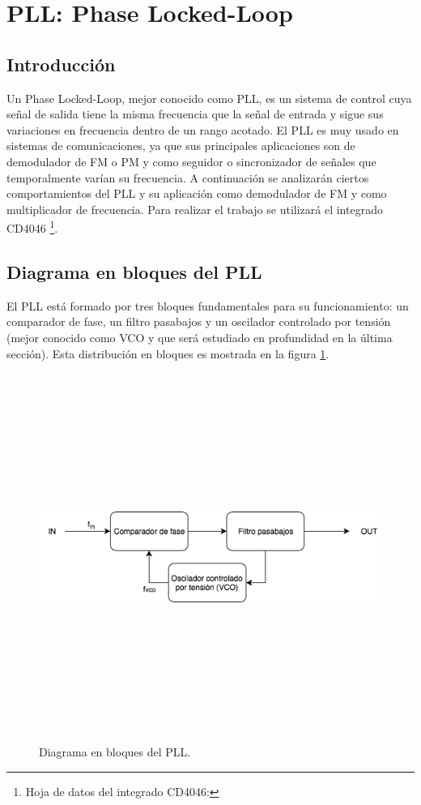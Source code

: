 \section{PLL: Phase Locked-Loop}

\subsection{Introducci\'on}

Un Phase Locked-Loop, mejor conocido como PLL, es un sistema de control cuya se\~nal de salida tiene la misma frecuencia que la se\~nal de entrada y sigue sus variaciones en frecuencia dentro de un rango acotado. El PLL es muy usado en sistemas de comunicaciones, ya que sus principales aplicaciones son de demodulador de FM o PM y como seguidor o sincronizador de se\~nales que temporalmente var\'ian su frecuencia. A continuaci\'on se analizar\'an ciertos comportamientos del PLL y su aplicaci\'on como demodulador de FM y como multiplicador de frecuencia. Para realizar el trabajo se utilizar\'a el integrado CD4046 \footnote{Hoja de datos del integrado CD4046:}.

\subsection{Diagrama en bloques del PLL}

El PLL est\'a formado por tres bloques fundamentales para su funcionamiento: un comparador de fase, un filtro pasabajos y un oscilador controlado por tensi\'on (mejor conocido como VCO y que ser\'a estudiado en profundidad en la \'ultima secci\'on). Esta distribuci\'on en bloques es mostrada en la figura \ref{pll}.

\begin{figure}[H] %
	\centering
	\includegraphics[width=12cm,height=12cm,keepaspectratio]{../EJ2/imagenes/PLL.png}
	\caption{Diagrama en bloques del PLL.}
	\label{pll}
\end{figure}


